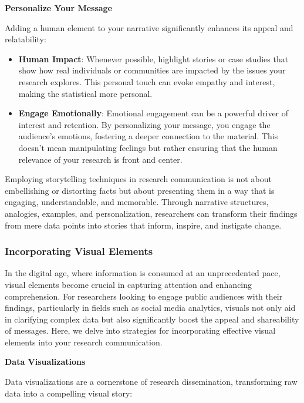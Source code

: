 \documentclass[
]{book}
\begin{document}
\textbf{Personalize Your Message}

Adding a human element to your narrative significantly enhances its appeal and relatability:

\begin{itemize}
\item
  \textbf{Human Impact}: Whenever possible, highlight stories or case studies that show how real individuals or communities are impacted by the issues your research explores. This personal touch can evoke empathy and interest, making the statistical more personal.
\item
  \textbf{Engage Emotionally}: Emotional engagement can be a powerful driver of interest and retention. By personalizing your message, you engage the audience's emotions, fostering a deeper connection to the material. This doesn't mean manipulating feelings but rather ensuring that the human relevance of your research is front and center.
\end{itemize}

Employing storytelling techniques in research communication is not about embellishing or distorting facts but about presenting them in a way that is engaging, understandable, and memorable. Through narrative structures, analogies, examples, and personalization, researchers can transform their findings from mere data points into stories that inform, inspire, and instigate change.

\hypertarget{incorporating-visual-elements}{%
\subsubsection*{Incorporating Visual Elements}\label{incorporating-visual-elements}}

In the digital age, where information is consumed at an unprecedented pace, visual elements become crucial in capturing attention and enhancing comprehension. For researchers looking to engage public audiences with their findings, particularly in fields such as social media analytics, visuals not only aid in clarifying complex data but also significantly boost the appeal and shareability of messages. Here, we delve into strategies for incorporating effective visual elements into your research communication.

\textbf{Data Visualizations}

Data visualizations are a cornerstone of research dissemination, transforming raw data into a compelling visual story:
\end{document}
